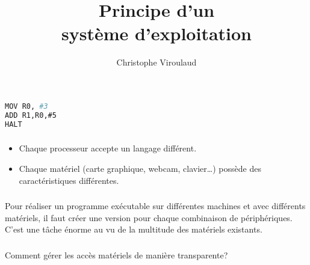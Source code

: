 \documentclass[svgnames,11pt]{beamer}
\author[]{Christophe Viroulaud}
\title{Principe d'un\\système d'exploitation}
\date{\framebox{\textbf{ArchMat 08}}}
\institute{Première - NSI}
\begin{document}
\begin{frame}
\titlepage
\end{frame}
\begin{frame}[fragile]
    \frametitle{}

    \begin{center}
        \begin{lstlisting}[language=Bash , basicstyle=\small, xleftmargin=2em, xrightmargin=2em]
MOV R0, #3
ADD R1,R0,#5
HALT
\end{lstlisting}
    \end{center}

\end{frame}
\begin{frame}
    \frametitle{}

    \begin{itemize}
        \item <1-> Chaque processeur accepte un langage différent.
        \item <2-> Chaque matériel (carte graphique, webcam, clavier\dots) possède des caractéristiques différentes.
    \end{itemize}

\end{frame}
\begin{frame}
    \frametitle{}

    \begin{aretenir}[]
    Pour réaliser un programme exécutable sur différentes machines et avec différents matériels, il faut créer une version pour chaque combinaison de périphériques.
    \\
    C'est une tâche énorme au vu de la multitude des matériels existants.
    \end{aretenir}

\end{frame}
\begin{frame}
    \frametitle{}

    \begin{framed}
        \centering Comment gérer les accès matériels de manière transparente?
    \end{framed}

\end{frame}
\end{document}
